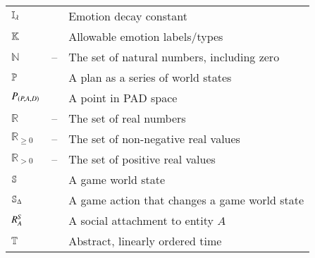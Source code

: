 \begin{center}
\begin{longtable*}{C{0.1\textwidth} C{0.1\textwidth}
            m{0.7\textwidth}}
        $\mathbb{I_{\lambda}}$ &  & Emotion decay constant
        \\

        $\mathbb{K}$ &  &
        Allowable emotion labels/types \\

        $\mathbb{N}$ & -- & The set of natural numbers, including zero \\

        $\mathbb{P}$ &  & A plan as a series
        of world states \\

        $P_{\left(P,A,D\right)}$ &  & A point in PAD space \\

        $\mathbb{R}$ & -- & The set of real numbers \\

        $\mathbb{R}_{\geq0}$ & -- & The set of non-negative real values \\

        $\mathbb{R}_{>0}$ & -- & The set of positive
        real values \\

        $\mathbb{S}$ &  & A game world state \\

        $\mathbb{S}_{\Delta}$ &
         & A game action that changes a game world
        state \\

        $R_{A}^{S}$ &  & A social attachment
        to entity $A$ \\

        $\mathbb{T}$ &  & Abstract, linearly 
        ordered time \\

        \bottomrule
    \end{longtable*}

\end{center}